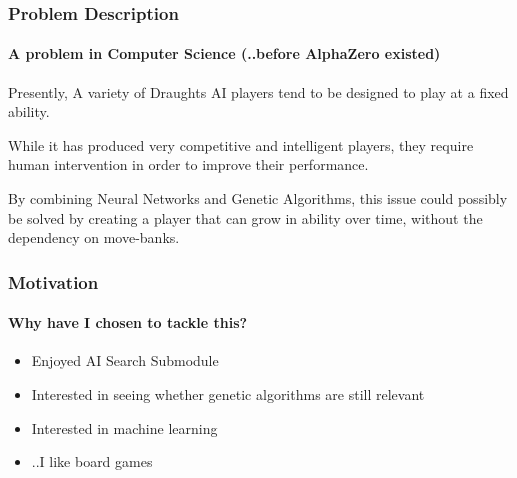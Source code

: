\documentclass[aspectratio=169]{beamer}
\begin{document}
\begin{frame}
  \frametitle{Problem Description}
	\framesubtitle{A problem in Computer Science (..before AlphaZero existed)}
	\setlength{\parskip}{1.5em}

	Presently, A variety of Draughts AI players tend to be designed to play at a fixed ability.
	\par
	While it has produced very competitive and intelligent players, they require human  intervention in order to improve their performance.
	\par
	By combining Neural Networks and Genetic Algorithms, this issue could possibly be solved by creating a player that can grow in ability over time, without the dependency on move-banks.


\end{frame}

\begin{frame}
	\frametitle{Motivation}
	\framesubtitle{Why have I chosen to tackle this?}

	\begin{itemize}
		\item Enjoyed AI Search Submodule
		\item Interested in seeing whether genetic algorithms are still relevant
		\item Interested in machine learning
		\item ..I like board games
	\end{itemize}

\end{frame}
\end{document}
